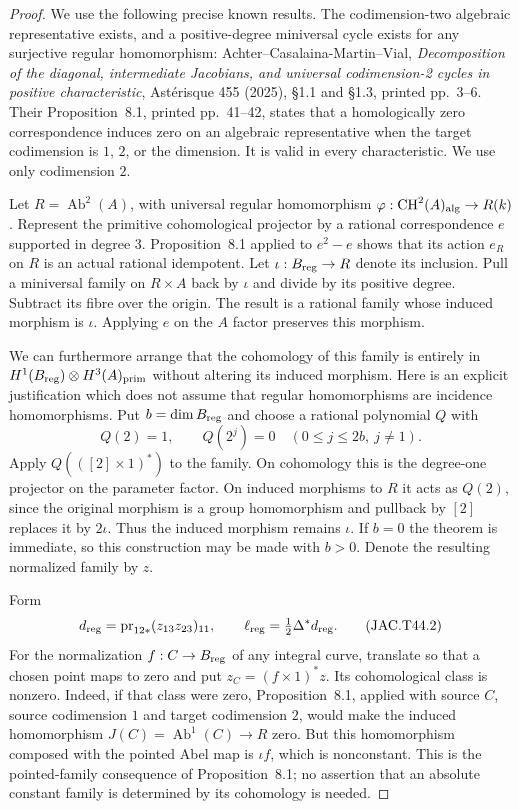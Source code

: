 \documentclass[11pt,a4paper]{article}
\begin{document}
\begin{proof}
We use the following precise known results. The codimension-two
algebraic representative exists, and a positive-degree miniversal
cycle exists for any surjective regular homomorphism:
Achter--Casalaina-Martin--Vial, \emph{Decomposition of the diagonal,
intermediate Jacobians, and universal codimension-2 cycles in positive
characteristic}, Ast\'erisque 455 (2025), \S1.1 and \S1.3, printed
pp.~3--6. Their Proposition~8.1, printed pp.~41--42, states that a
homologically zero correspondence induces zero on an algebraic
representative when the target codimension is $1$, $2$, or the
dimension. It is valid in every characteristic. We use only
codimension $2$.

Let $R=\operatorname{Ab}^2(A)$, with universal regular homomorphism
$\varphi:\operatorname{CH}^2(A)_{\rm alg}\to R(k)$.
Represent the primitive cohomological projector by a rational
correspondence $e$ supported in degree $3$. Proposition~8.1 applied
to $e^2-e$ shows that its action $e_R$ on $R$ is an actual rational
idempotent. Let $\iota:B_{\rm reg}\to R$ denote its inclusion.
Pull a miniversal family on $R\times A$ back by $\iota$ and divide
by its positive degree. Subtract its fibre over the origin. The
result is a rational family whose induced morphism is $\iota$.
Applying $e$ on the $A$ factor preserves this morphism.

We can furthermore arrange that the cohomology of this family is
entirely in $H^1(B_{\rm reg})\otimes H^3(A)_{\rm prim}$ without
altering its induced morphism. Here is an explicit justification
which does not assume that regular homomorphisms are incidence
homomorphisms. Put $b=\dim B_{\rm reg}$ and choose a rational
polynomial $Q$ with
\[
 Q(2)=1,\qquad Q(2^j)=0\quad(0\le j\le2b,\ j\ne1).
\]
Apply $Q(([2]\times1)^*)$ to the family. On cohomology this is the
degree-one projector on the parameter factor. On induced morphisms
to $R$ it acts as $Q(2)$, since the original morphism is a group
homomorphism and pullback by $[2]$ replaces it by $2\iota$.
Thus the induced morphism remains $\iota$. If $b=0$ the theorem is
immediate, so this construction may be made with $b>0$.
Denote the resulting normalized family by $z$.

Form
\[
 d_{\rm reg}=\operatorname{pr}_{12*}(z_{13}z_{23})_{11},
 \qquad \ell_{\rm reg}=\tfrac12\Delta^*d_{\rm reg}.
                                                        \tag{JAC.T44.2}
\]
For the normalization $f:C\to B_{\rm reg}$ of any integral curve,
translate so that a chosen point maps to zero and put
$z_C=(f\times1)^*z$. Its cohomological class is nonzero. Indeed,
if that class were zero, Proposition~8.1, applied with source $C$,
source codimension $1$ and target codimension $2$, would make the
induced homomorphism
$J(C)=\operatorname{Ab}^1(C)\to R$ zero. But this homomorphism
composed with the pointed Abel map is $\iota f$, which is
nonconstant. This is the pointed-family consequence of
Proposition~8.1; no assertion that an absolute constant family is
determined by its cohomology is needed.


\end{proof}
\end{document}
